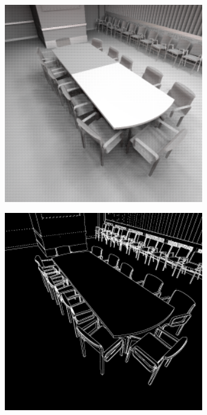 \begin{figure}[htb]
\begin{subfigure}[b]{0.33\textwidth}
                 \caption{}
                 \label{fig:concept:interleaved_segovia_3}
             \end{subfigure}
             \begin{subfigure}[b]{0.33\textwidth}
                 \centering
                 \includegraphics[width=0.95\textwidth]{graphics/interleaved_segovia_4}
                 \caption{}
                 \label{fig:concept:interleaved_segovia_4}
                 \end{subfigure}%
                 \begin{subfigure}[b]{0.33\textwidth}
                     \centering
                     \includegraphics[width=0.95\textwidth]{graphics/interleaved_segovia_5}

\end{subfigure}
\end{figure}
